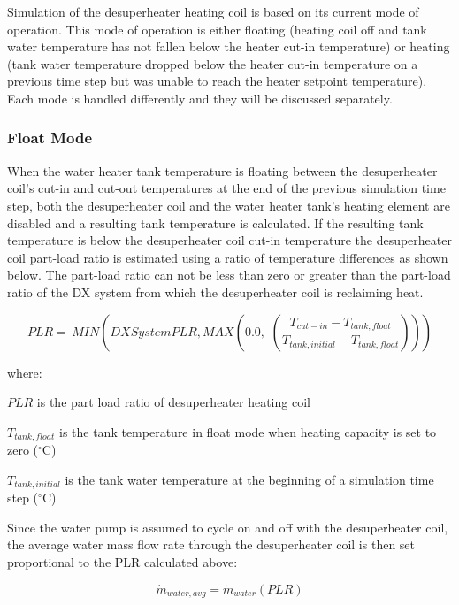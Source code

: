 Simulation of the desuperheater heating coil is based on its current mode of operation. This mode of operation is either floating (heating coil off and tank water temperature has not fallen below the heater cut-in temperature) or heating (tank water temperature dropped below the heater cut-in temperature on a previous time step but was unable to reach the heater setpoint temperature). Each mode is handled differently and they will be discussed separately.

\subsubsection{Float Mode}\label{float-mode}

When the water heater tank temperature is floating between the desuperheater coil's cut-in and cut-out temperatures at the end of the previous simulation time step, both the desuperheater coil and the water heater tank's heating element are disabled and a resulting tank temperature is calculated. If the resulting tank temperature is below the desuperheater coil cut-in temperature the desuperheater coil part-load ratio is estimated using a ratio of temperature differences as shown below. The part-load ratio can not be less than zero or greater than the part-load ratio of the DX system from which the desuperheater coil is reclaiming heat.

\begin{equation}
PLR = \,MIN\left( {DXSystemPLR,MAX\left( {0.0,\,\,\left( {\frac{{{T_{cut - in}} - {T_{tank,float}}}}{{{T_{tank,initial}} - {T_{tank,float}}}}} \right)} \right)} \right)
\end{equation}

where:

\(PLR\) is the part load ratio of desuperheater heating coil

\({T_{tank,float}}\) is the tank temperature in float mode when heating capacity is set to zero (\(^{\circ}\)C)

\({T_{tank,initial}}\) is the tank water temperature at the beginning of a simulation time step (\(^{\circ}\)C)

Since the water pump is assumed to cycle on and off with the desuperheater coil, the average water mass flow rate through the desuperheater coil is then set proportional to the PLR calculated above:

\begin{equation}
\dot{m}_{water,avg} = \dot{m}_{water}\left( {PLR} \right)
\end{equation}

